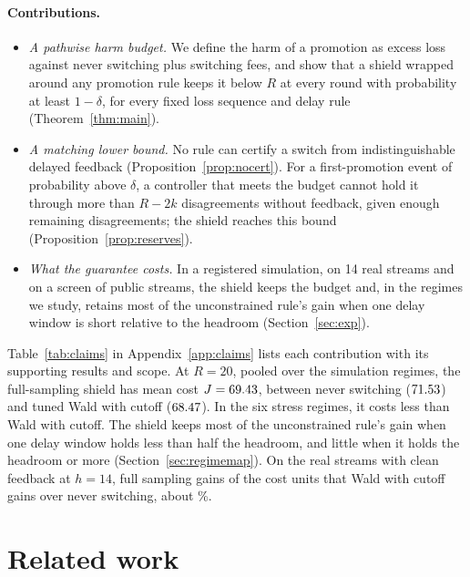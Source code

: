 \documentclass[10pt]{article}
\theoremstyle{plain}
\theoremstyle{definition}
\begin{document}
\paragraph{Contributions.}
\begin{itemize}\setlength\itemsep{0pt}
\item \emph{A pathwise harm budget.} We define the harm of a promotion as excess loss against never switching plus switching fees, and show that a shield wrapped around any promotion rule keeps it below $R$ at every round with probability at least $1-\delta$, for every fixed loss sequence and delay rule (Theorem~\ref{thm:main}).
\item \emph{A matching lower bound.} No rule can certify a switch from indistinguishable delayed feedback (Proposition~\ref{prop:nocert}). For a first-promotion event of probability above $\delta$, a controller that meets the budget cannot hold it through more than $R-2k$ disagreements without feedback, given enough remaining disagreements; the shield reaches this bound (Proposition~\ref{prop:reserves}).
\item \emph{What the guarantee costs.} In a registered simulation, on 14 real streams and on a screen of \ScreenPool{} public streams, the shield keeps the budget and, in the regimes we study, retains most of the unconstrained rule's gain when one delay window is short relative to the headroom (Section~\ref{sec:exp}).
\end{itemize}
Table~\ref{tab:claims} in Appendix~\ref{app:claims} lists each contribution with its supporting results and scope.
At $R=20$, pooled over the \NRegimes{} simulation regimes, the full-sampling shield has mean cost $J=69.43$, between never switching ($71.53$) and tuned Wald with cutoff ($68.47$). In the six stress regimes, it costs less than Wald with cutoff. The shield keeps most of the unconstrained rule's gain when one delay window holds less than half the headroom, and little when it holds the headroom or more (Section~\ref{sec:regimemap}). On the real streams with clean feedback at $h=14$, full sampling gains \RealPiVsNeverCleanHfourteen{} of the \RealWaldGain{} cost units that Wald with cutoff gains over never switching, about \RealPiShareFourteen\%.

\section{Related work}
\end{document}
